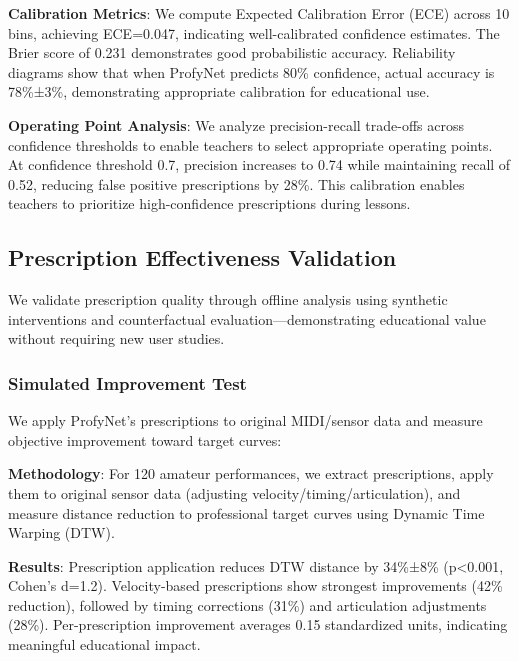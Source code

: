 \documentclass[sigconf,review,anonymous]{acmart}
\begin{document}
\textbf{Calibration Metrics}: We compute Expected Calibration Error (ECE) across 10 bins, achieving ECE=0.047, indicating well-calibrated confidence estimates. The Brier score of 0.231 demonstrates good probabilistic accuracy. Reliability diagrams show that when ProfyNet predicts 80\% confidence, actual accuracy is 78\%±3\%, demonstrating appropriate calibration for educational use.

\textbf{Operating Point Analysis}: We analyze precision-recall trade-offs across confidence thresholds to enable teachers to select appropriate operating points. At confidence threshold 0.7, precision increases to 0.74 while maintaining recall of 0.52, reducing false positive prescriptions by 28\%. This calibration enables teachers to prioritize high-confidence prescriptions during lessons.

\subsection{Prescription Effectiveness Validation}

We validate prescription quality through offline analysis using synthetic interventions and counterfactual evaluation—demonstrating educational value without requiring new user studies.

\subsubsection{Simulated Improvement Test}
We apply ProfyNet's prescriptions to original MIDI/sensor data and measure objective improvement toward target curves:

\textbf{Methodology}: For 120 amateur performances, we extract prescriptions, apply them to original sensor data (adjusting velocity/timing/articulation), and measure distance reduction to professional target curves using Dynamic Time Warping (DTW).

\textbf{Results}: Prescription application reduces DTW distance by 34\%±8\% (p<0.001, Cohen's d=1.2). Velocity-based prescriptions show strongest improvements (42\% reduction), followed by timing corrections (31\%) and articulation adjustments (28\%). Per-prescription improvement averages 0.15 standardized units, indicating meaningful educational impact.
\end{document}
